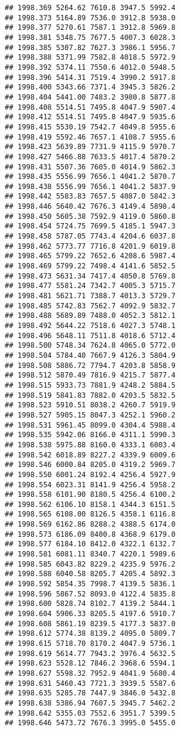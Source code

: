 \documentclass[
]{article}
\begin{document}
\begin{verbatim}
## 1998.369 5264.62 7610.8 3947.5 5992.4
## 1998.373 5164.89 7536.0 3912.8 5938.0
## 1998.377 5270.61 7587.1 3912.8 5969.8
## 1998.381 5348.75 7677.5 4007.3 6028.3
## 1998.385 5307.82 7627.3 3986.1 5956.7
## 1998.388 5371.99 7582.8 4018.5 5972.9
## 1998.392 5374.11 7550.6 4012.0 5948.5
## 1998.396 5414.31 7519.4 3990.2 5917.8
## 1998.400 5343.66 7371.4 3945.3 5826.2
## 1998.404 5441.00 7483.2 3980.8 5877.8
## 1998.408 5514.51 7495.8 4047.9 5907.4
## 1998.412 5514.51 7495.8 4047.9 5935.6
## 1998.415 5530.19 7542.7 4049.8 5955.6
## 1998.419 5592.46 7657.1 4108.7 5955.6
## 1998.423 5639.89 7731.9 4115.9 5970.7
## 1998.427 5466.88 7633.5 4017.4 5870.2
## 1998.431 5507.36 7605.0 4014.9 5862.3
## 1998.435 5556.99 7656.1 4041.2 5870.7
## 1998.438 5556.99 7656.1 4041.2 5837.9
## 1998.442 5583.83 7657.5 4087.0 5842.3
## 1998.446 5640.42 7676.3 4149.4 5898.4
## 1998.450 5605.38 7592.9 4119.0 5860.8
## 1998.454 5724.75 7699.5 4185.1 5947.3
## 1998.458 5787.05 7743.4 4204.6 6037.8
## 1998.462 5773.77 7716.8 4201.9 6019.8
## 1998.465 5799.22 7652.6 4208.6 5987.4
## 1998.469 5799.22 7498.4 4141.6 5852.5
## 1998.473 5631.34 7417.4 4050.8 5769.8
## 1998.477 5581.24 7342.7 4005.3 5715.7
## 1998.481 5621.71 7388.7 4013.3 5729.7
## 1998.485 5742.83 7562.7 4092.9 5832.7
## 1998.488 5689.89 7488.0 4052.3 5812.1
## 1998.492 5644.22 7518.6 4027.3 5748.1
## 1998.496 5648.11 7511.8 4018.6 5712.4
## 1998.500 5748.34 7624.8 4065.0 5772.0
## 1998.504 5784.40 7667.9 4126.3 5804.9
## 1998.508 5886.72 7794.7 4203.8 5858.9
## 1998.512 5870.49 7816.9 4215.7 5877.4
## 1998.515 5933.73 7881.9 4248.2 5884.5
## 1998.519 5841.83 7882.0 4203.5 5832.5
## 1998.523 5910.51 8038.2 4260.7 5919.9
## 1998.527 5905.15 8047.3 4252.1 5960.2
## 1998.531 5961.45 8099.0 4304.4 5988.4
## 1998.535 5942.06 8166.0 4311.1 5990.3
## 1998.538 5975.88 8160.0 4333.1 6003.4
## 1998.542 6018.89 8227.2 4339.9 6009.6
## 1998.546 6000.84 8205.0 4319.2 5969.7
## 1998.550 6001.24 8192.4 4256.4 5927.9
## 1998.554 6023.31 8141.9 4256.4 5958.2
## 1998.558 6101.90 8180.5 4256.4 6100.2
## 1998.562 6106.10 8158.1 4344.3 6151.5
## 1998.565 6108.00 8126.5 4358.1 6116.8
## 1998.569 6162.86 8288.2 4388.5 6174.0
## 1998.573 6186.09 8400.8 4368.9 6179.0
## 1998.577 6184.10 8412.0 4322.1 6132.7
## 1998.581 6081.11 8340.7 4220.1 5989.6
## 1998.585 6043.82 8229.2 4235.9 5976.2
## 1998.588 6040.58 8205.7 4205.4 5892.3
## 1998.592 5854.35 7998.7 4139.5 5836.1
## 1998.596 5867.52 8093.0 4122.4 5835.8
## 1998.600 5828.74 8102.7 4139.2 5844.1
## 1998.604 5906.33 8205.5 4197.6 5910.7
## 1998.608 5861.19 8239.5 4177.3 5837.0
## 1998.612 5774.38 8139.2 4095.0 5809.7
## 1998.615 5718.70 8170.2 4047.9 5736.1
## 1998.619 5614.77 7943.2 3976.4 5632.5
## 1998.623 5528.12 7846.2 3968.6 5594.1
## 1998.627 5598.32 7952.9 4041.9 5680.4
## 1998.631 5460.43 7721.3 3939.5 5587.6
## 1998.635 5285.78 7447.9 3846.0 5432.8
## 1998.638 5386.94 7607.5 3945.7 5462.2
## 1998.642 5355.03 7552.6 3951.7 5399.5
## 1998.646 5473.72 7676.3 3995.0 5455.0
\end{verbatim}
\end{document}
